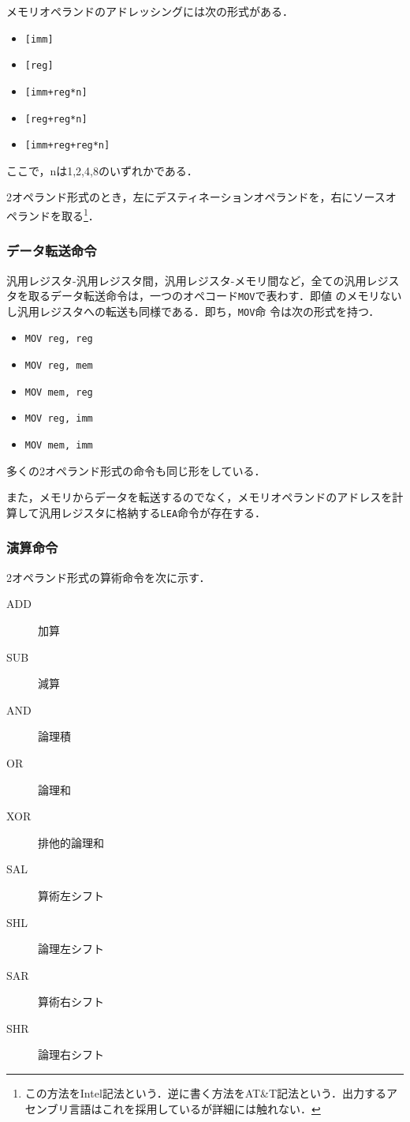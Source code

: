 \documentclass[a4paper,titlepage,disablejfam]{jsbook}
\begin{document}
メモリオペランドのアドレッシングには次の形式がある．
\begin{itemize}
 \item \lstinline|[imm]|
 \item \lstinline|[reg]|
 \item \lstinline|[imm+reg*n]|
 \item \lstinline|[reg+reg*n]|
 \item \lstinline|[imm+reg+reg*n]|
\end{itemize}
ここで，nは1,2,4,8のいずれかである．

2オペランド形式のとき，左にデスティネーションオペランドを，右にソースオ
ペランドを取る\footnote{この方法をIntel記法という．逆に書く方法をAT\&T記法という．出力するアセンブリ言語はこれを採用しているが詳細には触れない．}．

\subsubsection{データ転送命令}
汎用レジスタ-汎用レジスタ間，汎用レジスタ-メモリ間など，全ての汎用レジス
タを取るデータ転送命令は，一つのオペコード\lstinline|MOV|で表わす．即値
のメモリないし汎用レジスタへの転送も同様である．即ち，\lstinline|MOV|命
令は次の形式を持つ．
\begin{itemize}
 \item \lstinline|MOV reg, reg|
 \item \lstinline|MOV reg, mem|
 \item \lstinline|MOV mem, reg|
 \item \lstinline|MOV reg, imm|
 \item \lstinline|MOV mem, imm|
\end{itemize}
多くの2オペランド形式の命令も同じ形をしている．

また，メモリからデータを転送するのでなく，メモリオペランドのアドレスを計
算して汎用レジスタに格納する\lstinline|LEA|命令が存在する．

\subsubsection{演算命令}
2オペランド形式の算術命令を次に示す．
\begin{description}
 \item[ADD] 加算
 \item[SUB] 減算
 \item[AND] 論理積
 \item[OR] 論理和
 \item[XOR] 排他的論理和
 \item[SAL] 算術左シフト
 \item[SHL] 論理左シフト
 \item[SAR] 算術右シフト
 \item[SHR] 論理右シフト
\end{description}
\end{document}

